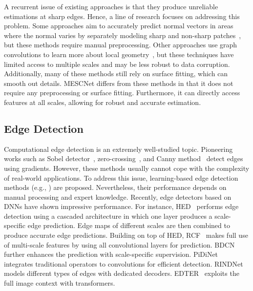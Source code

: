 \documentclass[sigconf]{acmart}
\begin{document}
A recurrent issue of existing approaches is that they produce unreliable estimations at sharp edges. Hence, a line of research focuses on addressing this problem. Some approaches aim to accurately predict normal vectors in areas where the normal varies by separately modeling sharp and non-sharp patches~\cite{lu2020deep,wang2022deep}, but these methods require manual preprocessing. Other approaches use graph convolutions to learn more about local geometry~\cite{lenssen2020deep,li2022graphfit}, but these techniques have limited access to multiple scales and may be less robust to data corruption. Additionally, many of these methods still rely on surface fitting, which can smooth out details. MESCNet differs from these methods in that it does not require any preprocessing or surface fitting. Furthermore, it can directly access features at all scales, allowing for robust and accurate estimation.






\subsection{Edge Detection}
Computational edge detection is an extremely well-studied topic. Pioneering works such as Sobel detector~\cite{kittler1983accuracy}, zero-crossing~\cite{marr1980theory}, and Canny method~\cite{canny1986computational} detect edges using gradients. However, these methods usually cannot cope with the complexity of real-world applications. To address this issue, learning-based edge detection methods (e.g., \cite{martin2004learning, arbelaez2010contour, dollar2014fast}) are proposed. Nevertheless, their performance depends on manual processing and expert knowledge.     
Recently, edge detectors based on DNNs have shown impressive performance. For instance, HED~\cite{xie2015holistically} performs edge detection using a cascaded architecture in which one layer produces a scale-specific edge prediction. 
Edge maps of different scales are then combined to produce accurate edge predictions.
Building on top of HED, RCF~\cite{liu2017richer} makes full use of multi-scale features by using all convolutional layers for prediction. BDCN~\cite{he2019bi} further enhances the prediction with scale-specific supervision. 
PiDiNet~\cite{su2021pixel} integrates traditional operators to convolutions for efficient detection. RINDNet~\cite{pu2021rindnet} models different types of edges with dedicated decoders.
EDTER~\cite{pu2022edter} exploits the full image context with transformers. 
\end{document}

